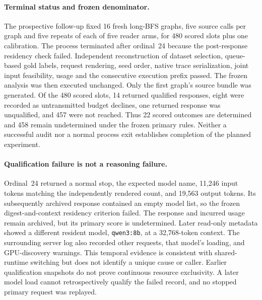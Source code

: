 \documentclass[10pt]{article}
\begin{document}
\paragraph{Terminal status and frozen denominator.} The prospective follow-up fixed 16 fresh long-BFS graphs, five source calls per graph and five repeats of each of five reader arms, for 480 scored slots plus one calibration. The process terminated after ordinal~24 because the post-response residency check failed. Independent reconstruction of dataset selection, queue-based gold labels, request rendering, seed order, native trace serialization, joint input feasibility, usage and the consecutive execution prefix passed. The frozen analysis was then executed unchanged. Only the first graph's source bundle was generated. Of the 480 scored slots, 14 returned qualified responses, eight were recorded as untransmitted budget declines, one returned response was unqualified, and 457 were not reached. Thus 22 scored outcomes are determined and 458 remain undetermined under the frozen primary rules. Neither a successful audit nor a normal process exit establishes completion of the planned experiment.

\paragraph{Qualification failure is not a reasoning failure.} Ordinal~24 returned a normal stop, the expected model name, 11,246 input tokens matching the independently rendered count, and 19,563 output tokens. Its subsequently archived \protect{} response contained an empty model list, so the frozen digest-and-context residency criterion failed. The response and incurred usage remain archived, but its primary score is undetermined. Later read-only metadata showed a different resident model, \texttt{qwen3:8b}, at a 32,768-token context. The surrounding server log also recorded other \protect{} requests, that model's loading, and GPU-discovery warnings. This temporal evidence is consistent with shared-runtime switching but does not identify a unique cause or caller. Earlier qualification snapshots do not prove continuous resource exclusivity. A later model load cannot retrospectively qualify the failed record, and no stopped primary request was replayed.
\end{document}
